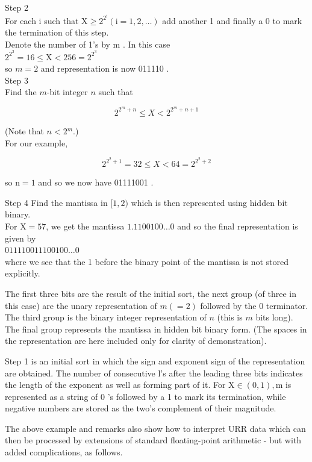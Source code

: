 \documentclass[10pt]{article}
\begin{document}
Step 2\\
For each i such that $\mathrm{X} \geqslant 2^{2^{\mathrm{i}}}(\mathrm{i}=1,2, \ldots)$ add another 1 and finally a 0 to mark the termination of this step.\\
Denote the number of 1's by m . In this case\\
$2^{2^{2}}=16 \leqslant \mathrm{X}<256=2^{2^{3}}$\\
so $m=2$ and representation is now 011110 .\\
Step 3\\
Find the $m$-bit integer $n$ such that

$$
2^{2^{m}+n} \leqslant X<2^{2^{m}+n+1}
$$

(Note that $n<2{ }^{m}$.)\\
For our example,

$$
2^{2^{2}+1}=32 \leqslant X<64=2^{2^{2}+2}
$$

so $\mathrm{n}=1$ and so we now have 01111001 .

Step 4 Find the mantissa in $[1,2)$ which is then represented using hidden bit binary.\\
For $\mathrm{X}=57$, we get the mantissa $1.1100100 \ldots 0$ and so the final representation is given by\\
$011110011100100 \ldots 0$\\
where we see that the 1 before the binary point of the mantissa is not stored explicitly.

The first three bits are the result of the initial sort, the next group (of three in this case) are the unary representation of $m(=2)$ followed by the 0 terminator. The third group is the binary integer representation of $n$ (this is $m$ bits long). The final group represents the mantissa in hidden bit binary form. (The spaces in the representation are here included only for clarity of demonstration).

Step 1 is an initial sort in which the sign and exponent sign of the representation are obtained. The number of consecutive l's after the leading three bits indicates the length of the exponent as well as forming part of it. For $\mathrm{X} \in(0,1), \mathrm{m}$ is represented as a string of 0 's followed by a 1 to mark its termination, while negative numbers are stored as the two's complement of their magnitude.

The above example and remarks also show how to interpret URR data which can then be processed by extensions of standard floating-point arithmetic - but with added complications, as follows.
\end{document}
